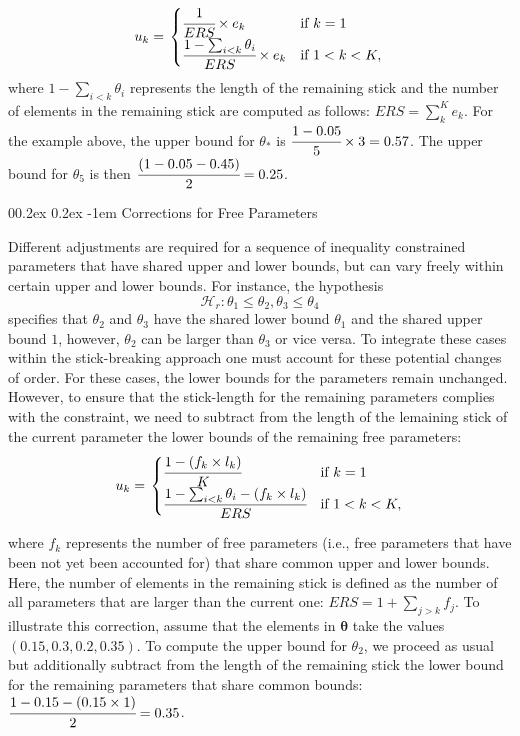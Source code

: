 \documentclass[
  english,
  man,floatsintext]{apa6}
\makeatletter
\let\oldparagraph\paragraph
\renewcommand{\paragraph}[1]{\oldparagraph{#1}\mbox{}}
\renewcommand{\paragraph}{\@startsection{paragraph}{4}{\parindent}%
  {0\baselineskip \@plus 0.2ex \@minus 0.2ex}%
  {-1em}%
  {\normalfont\normalsize\bfseries\itshape\typesectitle}}
\makeatother
\begin{document}
\begin{appendix}
\begin{align}
u_k = \left.
\begin{cases}
\cfrac{1}{ERS} \times e_k & \text{if } k = 1 \\
\cfrac{1 - \sum_{i < k} \theta_i}{ERS} \times e_k & \text{if } 1 < k < K,
\end{cases}
\right.
\end{align} where \(1 - \sum_{i < k} \theta_i\) represents the length of
the remaining stick and the number of elements in the remaining stick
are computed as follows: \(ERS = \sum_k^{K} e_k\). For the example
above, the upper bound for \(\theta_*\) is
\(\cfrac{1 - 0.05}{5} \times 3 = 0.57\). The upper bound for
\(\theta_5\) is then \(\cfrac{(1 - 0.05 - 0.45)}{2} = 0.25\).

\hypertarget{corrections-for-free-parameters}{%
\paragraph{Corrections for Free
Parameters}\label{corrections-for-free-parameters}}

Different adjustments are required for a sequence of inequality
constrained parameters that have shared upper and lower bounds, but can
vary freely within certain upper and lower bounds. For instance, the
hypothesis
\[\mathcal{H}_r: \theta_1 \leq \theta_2, \theta_3 \leq \theta_4\]
specifies that \(\theta_2\) and \(\theta_3\) have the shared lower bound
\(\theta_1\) and the shared upper bound \(1\), however, \(\theta_2\) can
be larger than \(\theta_3\) or vice versa. To integrate these cases
within the stick-breaking approach one must account for these potential
changes of order. For these cases, the lower bounds for the parameters
remain unchanged. However, to ensure that the stick-length for the
remaining parameters complies with the constraint, we need to subtract
from the length of the lemaining stick of the current parameter the
lower bounds of the remaining free parameters: \begin{align}
u_k = \left.
\begin{cases}
\cfrac{1 - (f_k \times l_k)}{K} & \text{if } k = 1 \\
\cfrac{1 - \sum_{i < k} \theta_i - (f_k \times l_k)}{ERS} & \text{if } 1 < k < K,
\end{cases}
\right.
\end{align}

where \(f_k\) represents the number of free parameters (i.e., free
parameters that have been not yet been accounted for) that share common
upper and lower bounds. Here, the number of elements in the remaining
stick is defined as the number of all parameters that are larger than
the current one: \(ERS = 1 + \sum_{j > k} f_j\). To illustrate this
correction, assume that the elements in \(\boldsymbol{\theta}\) take the
values \((0.15, 0.3, 0.2, 0.35)\). To compute the upper bound for
\(\theta_2\), we proceed as usual but additionally subtract from the
length of the remaining stick the lower bound for the remaining
parameters that share common bounds:
\(\cfrac{1 - 0.15 - (0.15 \times 1)}{2} = 0.35\).


\end{appendix}
\end{document}
